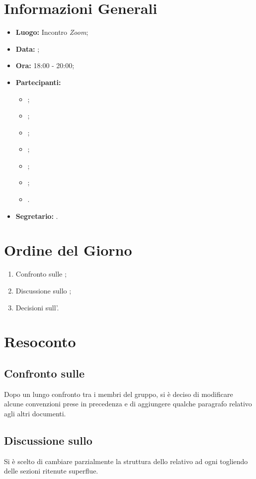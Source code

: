 \section{Informazioni Generali}
\begin{itemize}
\item \textbf{Luogo:} Incontro \textit{Zoom};
\item \textbf{Data:} \Data;
\item \textbf{Ora:} 18:00 - 20:00;
\item \textbf{Partecipanti:}
	\begin{itemize}
		\item \BL{}; 
		\item \FF{};
		\item \MM{}; 
		\item \PC{};
		\item \TG{};
		\item \TL{};
		\item \VD{}.
	\end{itemize} 
\item \textbf{Segretario:} \PC{}.
\end{itemize}

\section{Ordine del Giorno}
\begin{enumerate}
 \item Confronto sulle \textit{\NdP};
 \item Discussione sullo \textit{\SdF};
 \item Decisioni sull'\textit{\AdR}.
\end{enumerate}

\section{Resoconto}
\subsection{Confronto sulle \NdP}
Dopo un lungo confronto tra i membri del gruppo, si è deciso di modificare alcune convenzioni prese in precedenza e di aggiungere qualche paragrafo relativo agli altri documenti.

\subsection{Discussione sullo \SdF}
Si è scelto di cambiare parzialmente la struttura dello \textit{\SdF} relativo ad ogni  togliendo delle sezioni ritenute superflue.

